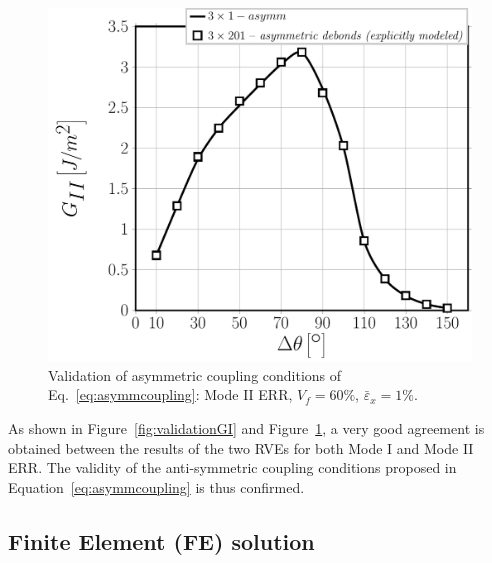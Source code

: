 \documentclass[smallextended]{svjour3}       %
\begin{document}
\begin{figure}[!h]
\centering
\includegraphics[width=\textwidth]{asymm-vs-explmodel-vf60-GII.pdf}
\caption{Validation of asymmetric coupling conditions of Eq.~\ref{eq:asymmcoupling}: Mode II ERR, $V_{f}=60\%$, $\bar{\varepsilon}_{x}=1\%$.}\label{fig:validationGII}
\end{figure}

As shown in Figure~\ref{fig:validationGI} and Figure~\ref{fig:validationGII}, a very good agreement is obtained between the results of the two RVEs for both Mode I and Mode II ERR. The validity of the anti-symmetric coupling conditions proposed in Equation~\ref{eq:asymmcoupling} is thus confirmed.

\subsection{Finite Element (FE) solution}
\end{document}
